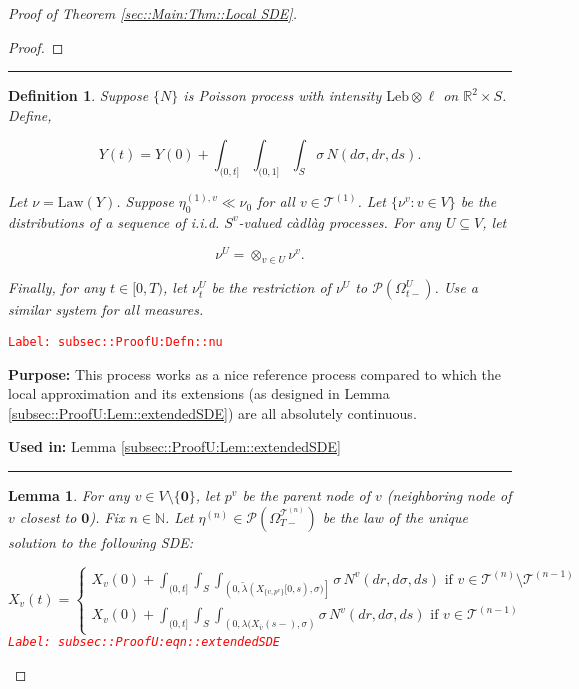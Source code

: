 \documentclass[12pt]{article}
\newcommand{\mb}{\mathbb}
\newcommand{\mc}{\mathcal}
\newcommand{\ov}{\overline}
\newcommand{\te}{\text}
\newcommand{\tr}{\textcolor{red}}
\newcommand{\labe}[1]{\tr{\texttt{Label: #1}}}
\newcommand{\purpose}{\textbf{Purpose: }}
\newcommand{\usein}{\textbf{Used in: }}
\newcommand{\lin}{\rule{\linewidth}{0.4 pt}}
\newcommand{\pmsr}{\mc{P}}							%
\renewcommand{\root}{\mathbf{0}}				%
\renewcommand{\v}{v}							%
\renewcommand{\U}{U}							%
\renewcommand{\S}{S}							%
\newcommand{\s}{\sigma}							%
\newcommand{\T}{T}								%
\renewcommand{\t}{t}							%
\newcommand{\sset}{\Omega}						%
\renewcommand{\tt}{s}							%
\newcommand{\X}{X}								%
\newcommand{\vind}[1]{^{#1}}					%
\newcommand{\carp}[1]{^{#1}}					%
\newcommand{\vsi}[1]{^{#1}}						%
\newcommand{\cind}[1]{_{#1}}					%
\newcommand{\cl}{\ov}							%
\newcommand{\tp}[1]{(#1)}						%
\newcommand{\tip}[1]{#1}						%
\newcommand{\ts}[1]{_{#1}}						%
\newcommand{\slnvind}[2]{^{(#1),#2}}				%
\newcommand{\tree}{\mc{T}}						%
\newcommand{\sln}[1]{^{(#1)}}					%
\newcommand{\poiss}{N}							%
\newcommand{\leb}{\te{Leb}}						%
\newcommand{\Sm}{\ell}							%
\newcommand{\rate}{\lambda}						%
\renewcommand{\r}{r}							%
\newcommand{\alt}[1]{\widetilde{#1}}			%
\newcommand{\mm}{\nu}							%
\newcommand{\mmm}{\eta}							%
\newcommand{\law}{\te{Law}}						%
\newcommand{\XX}{Y}								%
\newcommand{\crate}{\alt{\lambda}}				%
\newcommand{\p}{p}								%
\newtheorem{lem}[thms]{Lemma}
\newtheorem{defn}[thms]{Definition}
\begin{document}
\begin{proof}[Proof of Theorem \ref{sec::Main:Thm::Local SDE}]
\begin{proof}
\end{proof}

\lin

\begin{defn}
Suppose \(\{\poiss\}\) is Poisson process with intensity \(\leb\otimes \Sm\) on \(\mb{R}^2\times \S\). Define,

\[\XX\tp{\t} = \XX\tp{0} + \int_{(0,\t]}\int_{(0,1]}\int_\S\s\,\poiss(d\s,d\r,d\tt).\]

Let \(\mm = \law(\XX)\). Suppose \(\mmm\slnvind{1}{\v}\ts{0}\ll\mm\ts{0}\) for all \(\v\in\tree\sln{1}\). Let \(\{\mm\vind{\v}:\v\in V\}\) be the distributions of a sequence of i.i.d. \(\S\carp{\v}\)-valued c\`adl\`ag processes. For any \(\U\subseteq V\), let 

\[\mm\vind{\U} = \otimes_{\v\in\U} \mm\vind{\v}.\]

Finally, for any \(\t\in [0,\T)\), let \(\mm\vind{\U}\ts{\t}\) be the restriction of \(\mm\vind{\U}\) to \(\pmsr(\sset\vsi{\U}\ts{\t-})\). Use a similar system for all measures.
\label{subsec::ProofU:Defn::nu}
\end{defn}
\labe{subsec::ProofU:Defn::nu}

\purpose This process works as a nice reference process compared to which the local approximation and its extensions (as designed in Lemma \ref{subsec::ProofU:Lem::extendedSDE}) are all absolutely continuous.

\usein Lemma \ref{subsec::ProofU:Lem::extendedSDE}

\lin

\begin{lem}
For any \(\v \in V\setminus\{\root\}\), let \(\p\vind{\v}\) be the parent node of \(\v\) (neighboring node of \(\v\) closest to \(\root\)). Fix \(n \in \mb{N}\). Let \(\mmm\sln{n} \in \pmsr\left(\sset\vsi{\tree\sln{n}}\ts{\T-}\right)\) be the law of the unique solution to the following SDE:

\begin{equation}
\X\cind{\v}\tp{\t} = \begin{cases}
\X\cind{\v}\tp{0} + \int_{(0,\t]}\int_\S\int_{\left(0,\crate(\X\cind{\{\v,\p\vind{\v}\}}\tip{[0,\tt)},\s)\right]}\s\,\poiss\vind{\v}(d\r,d\s,d\tt)\te{ if } \v \in \tree\sln{n}\setminus \tree\sln{n-1}\\
\X\cind{\v}\tp{0} + \int_{(0,\t]}\int_\S\int_{\left(0,\rate(\X\cind{\cl{\v}}\tp{\tt-},\s\right)}\s\,\poiss\vind{\v}(d\r,d\s,d\tt)\te{ if } \v \in \tree\sln{n-1}
\end{cases}
\label{subsec::ProofU:eqn::extendedSDE}
\end{equation}
\labe{subsec::ProofU:eqn::extendedSDE}


\end{lem}
\end{proof}
\end{document}
